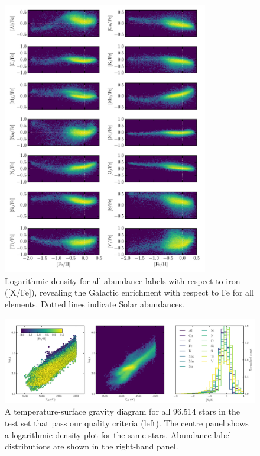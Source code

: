 \documentclass[12pt,preprint]{aastex}
\begin{document}
\begin{figure}[p]
\centering
\includegraphics[width=0.8\textwidth]{test-step-gce.pdf}
\caption{Logarithmic density for all abundance labels with respect to iron ([X/Fe]), revealing the Galactic  enrichment with respect to Fe for all elements. Dotted lines indicate Solar abundances.\label{fig:gce}}
\end{figure}

\clearpage

\begin{figure}[p]
\includegraphics[width=\textwidth]{test_set_hrd.pdf}
\caption{A temperature-surface gravity diagram for all 96,514 stars in the test set that pass our quality criteria (left). The centre panel shows a logarithmic density plot for the same stars. Abundance label distributions are shown in the right-hand panel.\label{fig:test-set-hrd}}
\end{figure}
\end{document}
